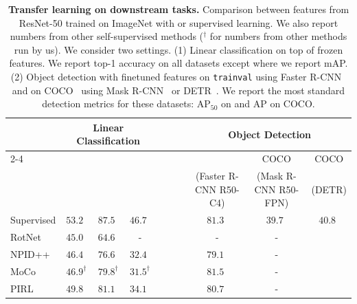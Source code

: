 \begin{table}[h]
\centering
    \caption{
\textbf{Transfer learning on downstream tasks.}
Comparison between features from ResNet-50 trained on ImageNet with \OURS or supervised learning.
We also report numbers from other self-supervised methods ($^\dagger$ for numbers from other methods run by us).
We consider two settings.
(1) Linear classification on top of frozen features. We report top-1 accuracy on all datasets except \VOCseven where we report mAP.
	(2) Object detection with finetuned features on \VOCseventwelve \texttt{trainval} using Faster R-CNN~\cite{ren2015faster} and on COCO~\cite{lin2014microsoft} using Mask R-CNN~\cite{he2017mask} or DETR~\cite{carion2020end}.
We report the most standard detection metrics for these datasets: $\text{AP}_{50}$ on \VOCseventwelve and $\text{AP}$ on COCO.
    }
    \label{tab:frozen_and_detect_ap}
    \vspace{.4em}
  \setlength{\tabcolsep}{3.7pt}
    \begin{tabular}{ @{} l ccc c ccc @{} }
      \toprule
       & \multicolumn{3}{c}{Linear Classification} &~~~~& \multicolumn{3}{c}{Object Detection}\\
\cmidrule{2-4}\cmidrule{6-8}
	    &\Places & \VOCseven & \iNat && \VOCseventwelve & COCO & COCO \\
	    & &  &  && \scriptsize(Faster R-CNN R50-C4) & \scriptsize(Mask R-CNN R50-FPN) & \scriptsize(DETR) \\
      \midrule
	    Supervised & $53.2^{\phantom{\dagger}}$  & $87.5^{\phantom{\dagger}}$ & $46.7^{\phantom{\dagger}}$ && $81.3^{\phantom{\dagger}}$ & $39.7^{\phantom{\dagger}}$ & $40.8^{\phantom{\dagger}}$ \\
      \midrule
	    RotNet~\cite{gidaris2020learning} & $45.0^{\phantom{\dagger}}$ & $64.6^{\phantom{\dagger}}$ & - && - & - \\
	    NPID++~\cite{misra2019self} & $46.4^{\phantom{\dagger}}$ & $76.6^{\phantom{\dagger}}$ & $32.4^{\phantom{\dagger}}$ && $79.1^{\phantom{\dagger}}$ & - \\
	    MoCo~\cite{he2019momentum} & $46.9^{\dagger}$ & $79.8^{\dagger}$ & $31.5^{\dagger}$ && $81.5^{\phantom{\dagger}}$ & - \\
	    PIRL~\cite{misra2019self} & $49.8^{\phantom{\dagger}}$ & $81.1^{\phantom{\dagger}}$ & $34.1^{\phantom{\dagger}}$ && $80.7^{\phantom{\dagger}}$ & - \\

\end{tabular}
\end{table}
